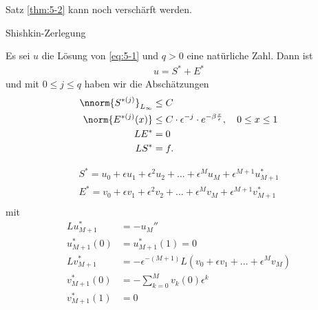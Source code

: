Satz \ref{thm:5-2} kann noch verschärft werden.
\begin{lemma}\label{lem:5-3} Shishkin-Zerlegung
  
Es sei $u$ die Lösung von \eqref{eq:5-1} und $q >0$ eine natürliche Zahl. Dann ist
\begin{align*}
  u = S^{*} + E^{*}
\end{align*}
und mit $0 \leq j\leq q$ haben wir die Abschätzungen
\begin{align*}
   \nnorm{S^{*(j)}}_{L_{\infty}} &\leq C\\
\norm{E^{*(j)} (x)} &\leq C\cdot \epsilon^{-j}\cdot e^{- \beta \frac x \epsilon}, \quad 0 \leq x \leq 1\\
LE^{*} &= 0\\
LS^{*} &= f. 
\end{align*}
\end{lemma}
\begin{beweisidee}
  \begin{align*}
      S^{*} = u_{0} + \epsilon u_{1} + \epsilon^{2} u_{2} + \dots + \epsilon^{M} u_{M} + \epsilon^{M+1}u^{*}_{M+1}\\
      E^{*} = v_{0} + \epsilon v_{1} + \epsilon^{2} v_{2} + \dots + \epsilon^{M} v_{M} + \epsilon^{M+1}v^{*}_{M+1}\\
  \end{align*}
mit
\begin{align*}
  Lu^{*}_{M+1} &= - u_{M}''\\
  u_{M+1}^{*}(0) &= u^{*}_{M+1}(1) = 0\\
  Lv^{*}_{M+1} &= - \epsilon^{-(M+1)} L(v_{0} + \epsilon v_{1} + \dots + \epsilon^{M}v_{M})\\
  v_{M+1}^{*}(0) &= - \sum_{k = 0}^{M} v_{k}(0) \epsilon^{k}\\
  v_{M+1}^{*}(1) &= 0
\end{align*}
\end{beweisidee}

